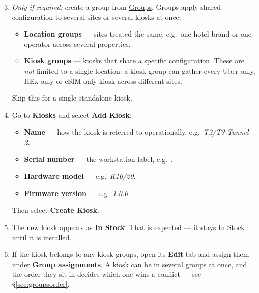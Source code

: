 \documentclass[a4paper,10pt]{article}
\begin{document}
\begin{enumerate}\setcounter{enumi}{2}
  \item \emph{Only if required:} create a group from
        \href{https://command.weknow.technology/groups}{Groups}. Groups
        apply shared configuration to several sites or several kiosks at
        once:
    \begin{itemize}
      \item \textbf{Location groups} --- sites treated the same, e.g.\ one
            hotel brand or one operator across several properties.
      \item \textbf{Kiosk groups} --- kiosks that share a specific
            configuration. These are \emph{not} limited to a single
            location: a kiosk group can gather every Uber-only, HEx-only
            or eSIM-only kiosk across different sites.
    \end{itemize}
    Skip this for a single standalone kiosk.

  \item Go to \textbf{Kiosks} and select \textbf{Add Kiosk}:
    \begin{itemize}
      \item \textbf{Name} --- how the kiosk is referred to operationally,
            e.g.\ \emph{T2/T3 Tunnel - 2}.
      \item \textbf{Serial number} --- the workstation label,
            e.g.\ .
      \item \textbf{Hardware model} --- e.g.\ \emph{K10/20}.
      \item \textbf{Firmware version} --- e.g.\ \emph{1.0.0}.
    \end{itemize}
    Then select \textbf{Create Kiosk}.
\end{enumerate}


\begin{enumerate}\setcounter{enumi}{4}
  \item The new kiosk appears as \textbf{In Stock}. That is expected ---
        it stays In Stock until it is installed.

  \item If the kiosk belongs to any kiosk groups, open its \textbf{Edit}
        tab and assign them under \textbf{Group assignments}. A kiosk can
        be in several groups at once, and the order they sit in decides
        which one wins a conflict --- see \S\ref{sec:groupsorder}.
\end{enumerate}
\end{document}
